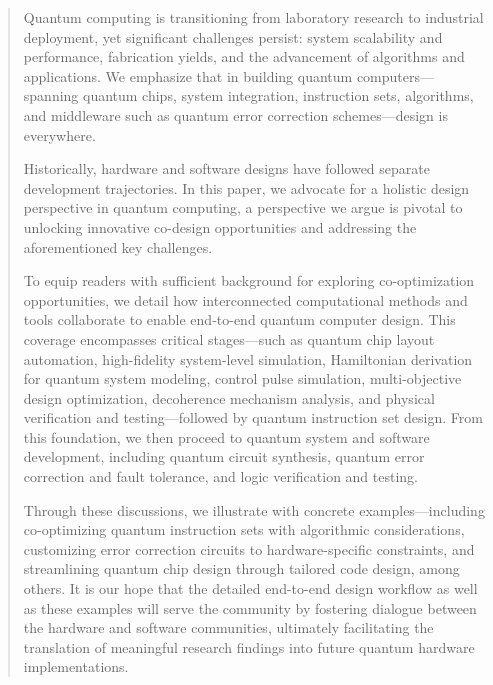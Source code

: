\documentclass[a4paper,onecolumn,11pt,unpublished]{quantumarticle}
\begin{document}
\begin{abstract}
Quantum computing is transitioning from laboratory research to industrial deployment, yet significant challenges persist: system scalability and performance, fabrication yields, and the advancement of algorithms and applications. We emphasize that in building quantum computers---spanning quantum chips, system integration, instruction sets, algorithms, and middleware such as quantum error correction schemes---design is everywhere. 

Historically, hardware and software designs have followed separate development trajectories. In this paper, we advocate for a holistic design perspective in quantum computing, a perspective we argue is pivotal to unlocking innovative co-design opportunities and addressing the aforementioned key challenges. 

To equip readers with sufficient background for exploring co-optimization opportunities, we detail how interconnected computational methods and tools collaborate to enable end-to-end quantum computer design. This coverage encompasses critical stages---such as quantum chip layout automation, high-fidelity system-level simulation, Hamiltonian derivation for quantum system modeling, control pulse simulation, multi-objective design optimization, decoherence mechanism analysis, and physical verification and testing---followed by quantum instruction set design. From this foundation, we then proceed to quantum system and software development, including quantum circuit synthesis, quantum error correction and fault tolerance, and logic verification and testing. 

Through these discussions, we illustrate with concrete examples---including co-optimizing quantum instruction sets with algorithmic considerations, customizing error correction circuits to hardware-specific constraints, and streamlining quantum chip design through tailored code design, among others. It is our hope that the detailed end-to-end design workflow as well as these examples will serve the community by fostering dialogue between the hardware and software communities, ultimately facilitating the translation of meaningful research findings into future quantum hardware implementations.

\end{abstract}
\end{document}
